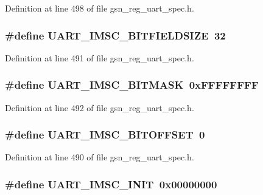 Definition at line 498 of file gsn\_\-reg\_\-uart\_\-spec.h.

\hypertarget{a00575_a399a85ea2a452d7780c8324d9245a7e7}{
\subsubsection[{UART\_\-IMSC\_\-BITFIELDSIZE}]{\setlength{\rightskip}{0pt plus 5cm}\#define UART\_\-IMSC\_\-BITFIELDSIZE~32}}
\label{a00575_a399a85ea2a452d7780c8324d9245a7e7}


Definition at line 491 of file gsn\_\-reg\_\-uart\_\-spec.h.

\hypertarget{a00575_ae975026a789b3e5831b9ca0243bab4d8}{
\subsubsection[{UART\_\-IMSC\_\-BITMASK}]{\setlength{\rightskip}{0pt plus 5cm}\#define UART\_\-IMSC\_\-BITMASK~0xFFFFFFFF}}
\label{a00575_ae975026a789b3e5831b9ca0243bab4d8}


Definition at line 492 of file gsn\_\-reg\_\-uart\_\-spec.h.

\hypertarget{a00575_ace84ef5c40fa4c197a5a96e72157df0c}{
\subsubsection[{UART\_\-IMSC\_\-BITOFFSET}]{\setlength{\rightskip}{0pt plus 5cm}\#define UART\_\-IMSC\_\-BITOFFSET~0}}
\label{a00575_ace84ef5c40fa4c197a5a96e72157df0c}


Definition at line 490 of file gsn\_\-reg\_\-uart\_\-spec.h.

\hypertarget{a00575_a35c0c386692be930a90c40845d45ddf5}{
\subsubsection[{UART\_\-IMSC\_\-INIT}]{\setlength{\rightskip}{0pt plus 5cm}\#define UART\_\-IMSC\_\-INIT~0x00000000}}
\label{a00575_a35c0c386692be930a90c40845d45ddf5}


